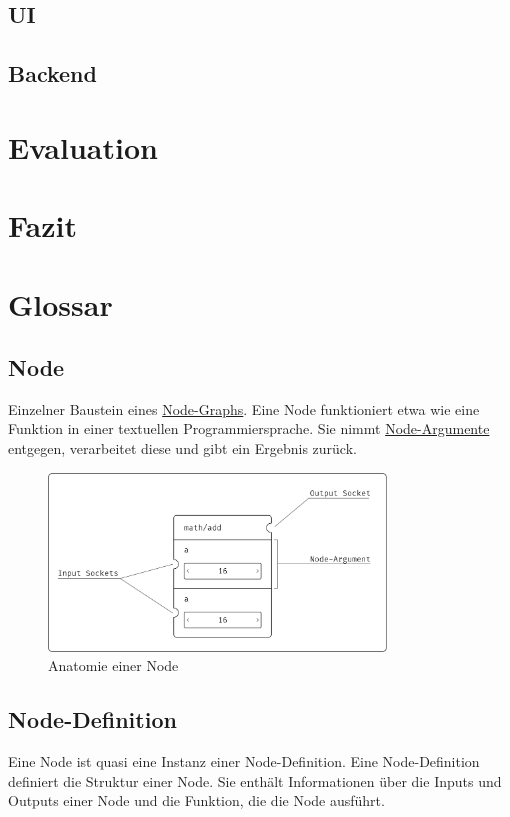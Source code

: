 \documentclass[ngerman]{article}
\begin{document}
\subsection{UI}
\subsection{Backend}

\section{Evaluation}
\section{Fazit}

\pagebreak
\section{Glossar}

\subsection{Node}
\label{sec:node}
Einzelner Baustein eines \hyperref[sec:node_graph]{Node-Graphs}. Eine Node funktioniert etwa wie eine Funktion in einer textuellen Programmiersprache. Sie nimmt \hyperref[sec:node_argumente]{Node-Argumente} entgegen, verarbeitet diese und gibt ein Ergebnis zurück. 

\begin{figure}[htbp]
    \centering
    \includegraphics[width=0.8\textwidth]{graphics/NODE_ANATOMY.pdf}
    \caption{Anatomie einer Node}
    \label{sec:NODE_ANATOMY}
\end{figure}

\subsection{Node-Definition}
\label{sec:node_definition}
Eine Node ist quasi eine Instanz einer Node-Definition. Eine Node-Definition definiert die Struktur einer Node. Sie enthält Informationen über die Inputs und Outputs einer Node und die Funktion, die die Node ausführt.
\end{document}
